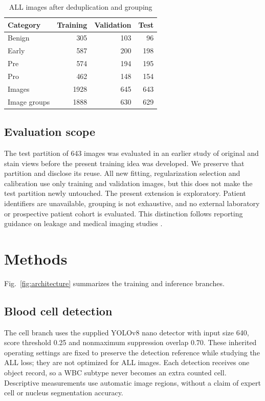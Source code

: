 \documentclass[conference,letterpaper]{IEEEtran}
\begin{document}
\begin{table}[!t]
\caption{ALL images after deduplication and grouping}
\label{tab:data}
\centering\footnotesize
\begin{tabular}{|l|r|r|r|}
\hline Category & Training & Validation & Test\\\hline
Benign & 305 & 103 & 96\\\hline
Early & 587 & 200 & 198\\\hline
Pre & 574 & 194 & 195\\\hline
Pro & 462 & 148 & 154\\\hline
Images & 1928 & 645 & 643\\\hline
Image groups & 1888 & 630 & 629\\\hline
\end{tabular}
\end{table}

\subsection{Evaluation scope}
The test partition of 643 images was evaluated in an earlier study of original and stain views before the present training idea was developed. We preserve that partition and disclose its reuse. All new fitting, regularization selection and calibration use only training and validation images, but this does not make the test partition newly untouched. The present extension is exploratory. Patient identifiers are unavailable, grouping is not exhaustive, and no external laboratory or prospective patient cohort is evaluated. This distinction follows reporting guidance on leakage and medical imaging studies \cite{leakage_questions,claim}.

\section{Methods}
Fig.~\ref{fig:architecture} summarizes the training and inference branches.
\subsection{Blood cell detection}
The cell branch uses the supplied YOLOv8 nano detector with input size 640, score threshold 0.25 and nonmaximum suppression overlap 0.70. These inherited operating settings are fixed to preserve the detection reference while studying the ALL loss; they are not optimized for ALL images. Each detection receives one object record, so a WBC subtype never becomes an extra counted cell. Descriptive measurements use automatic image regions, without a claim of expert cell or nucleus segmentation accuracy.
\end{document}
